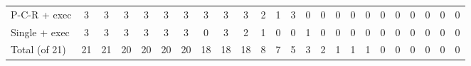 \begin{tabular}{lccccccccccccccccccccccc}
P-C-R + exec & \cellcolor{blue!75}3 & \cellcolor{blue!75}3 & \cellcolor{blue!75}3 & \cellcolor{blue!75}3 & \cellcolor{blue!75}3 & \cellcolor{blue!75}3 & \cellcolor{blue!75}3 & \cellcolor{blue!75}3 & \cellcolor{blue!75}3 & \cellcolor{blue!45}2 & \cellcolor{blue!20}1 & \cellcolor{blue!75}3 & 0 & 0 & 0 & 0 & 0 & 0 & 0 & 0 & 0 & 0 & 0 \\
Single + exec & \cellcolor{blue!75}3 & \cellcolor{blue!75}3 & \cellcolor{blue!75}3 & \cellcolor{blue!75}3 & \cellcolor{blue!75}3 & \cellcolor{blue!75}3 & 0 & \cellcolor{blue!75}3 & \cellcolor{blue!45}2 & \cellcolor{blue!20}1 & 0 & 0 & \cellcolor{blue!20}1 & 0 & 0 & 0 & 0 & 0 & 0 & 0 & 0 & 0 & 0 \\
\hline
Total (of 21) & 21 & 21 & 20 & 20 & 20 & 20 & 18 & 18 & 18 & 8 & 7 & 5 & 3 & 2 & 1 & 1 & 1 & 0 & 0 & 0 & 0 & 0 & 0 \\
\end{tabular}
